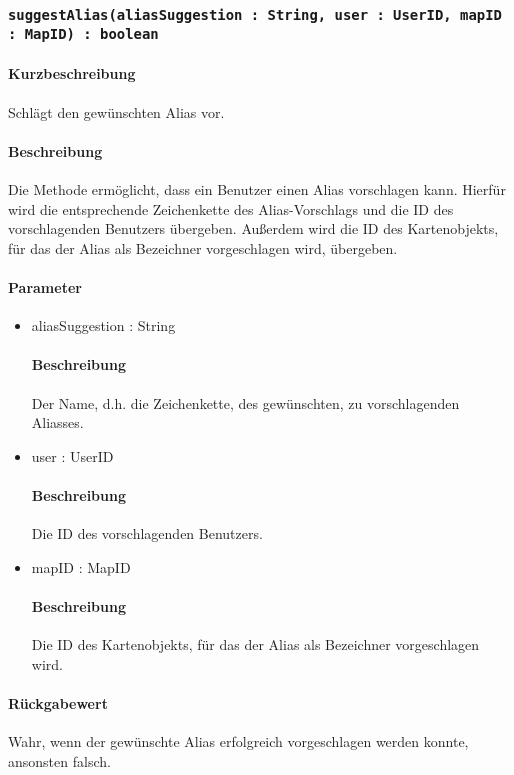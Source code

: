 \subsubsection{\texttt{suggestAlias(aliasSuggestion : String, user : UserID, mapID : MapID) : boolean}}%
\paragraph*{Kurzbeschreibung}
Schlägt den gewünschten Alias vor.
\paragraph*{Beschreibung}
Die Methode ermöglicht, dass ein Benutzer einen Alias vorschlagen kann. 
Hierfür wird die entsprechende Zeichenkette des Alias-Vorschlags und die ID des vorschlagenden Benutzers übergeben.
Außerdem wird die ID des Kartenobjekts, für das der Alias als Bezeichner vorgeschlagen wird, übergeben.
\paragraph*{Parameter}
\begin{itemize}
	\item aliasSuggestion : String
		\paragraph*{Beschreibung}
		Der Name, d.h. die Zeichenkette, des gewünschten, zu vorschlagenden Aliasses.
	\item user : UserID
		\paragraph*{Beschreibung}
		Die ID des vorschlagenden Benutzers.
	\item mapID : MapID
		\paragraph*{Beschreibung}
		Die ID des Kartenobjekts, für das der Alias als Bezeichner vorgeschlagen wird.
\end{itemize}
\paragraph*{Rückgabewert}
Wahr, wenn der gewünschte Alias erfolgreich vorgeschlagen werden konnte, ansonsten falsch.
